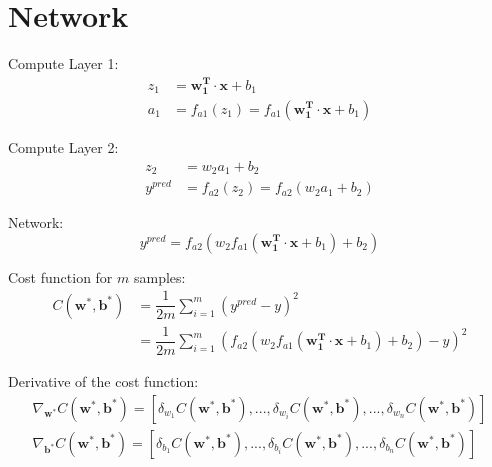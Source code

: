 \documentclass{article}
\begin{document}
\section*{Network}
\begin{center}
\end{center}

Compute Layer 1:
\begin{align}
  z_1 &= \mathbf{w_1^T} \cdot \mathbf{x} + b_1 \nonumber \\
  a_1 &= f_{a1}(z_1) = f_{a1}(\mathbf{w_1^T} \cdot \mathbf{x} + b_1)
\end{align}

Compute Layer 2:
\begin{align}
  z_2 &= w_2 a_1 + b_2 \nonumber \\
  y^{pred} &= f_{a2}(z_2) = f_{a2}(w_2 a_1 + b_2)
\end{align}

Network:
\begin{equation}
  y^{pred} = f_{a2}(w_2 f_{a1}(\mathbf{w_1^T} \cdot \mathbf{x} + b_1) + b_2)
\end{equation}

Cost function for $m$ samples:
\begin{align}
  C(\mathbf{w^*},\mathbf{b^*}) &= \dfrac{1}{2m} \sum_{i=1}^m (y^{pred} - y)^2 \nonumber \\
  &= \dfrac{1}{2m} \sum_{i=1}^m (f_{a2}(w_2 f_{a1}(\mathbf{w_1^T} \cdot \mathbf{x} + b_1) + b_2) - y)^2
\end{align}

Derivative of the cost function:
\begin{align}
  \nabla_{\mathbf{w^*}}C(\mathbf{w^*}, \mathbf{b^*}) = [\delta_{w_1} C(\mathbf{w^*}, \mathbf{b^*}), ..., \delta_{w_i} C(\mathbf{w^*}, \mathbf{b^*}), ..., \delta_{w_n} C(\mathbf{w^*}, \mathbf{b^*})]  \\
  \nabla_{\mathbf{b^*}}C(\mathbf{w^*}, \mathbf{b^*}) = [\delta_{b_1} C(\mathbf{w^*}, \mathbf{b^*}), ..., \delta_{b_i} C(\mathbf{w^*}, \mathbf{b^*}), ..., \delta_{b_n} C(\mathbf{w^*}, \mathbf{b^*})]
\end{align}
\end{document}
